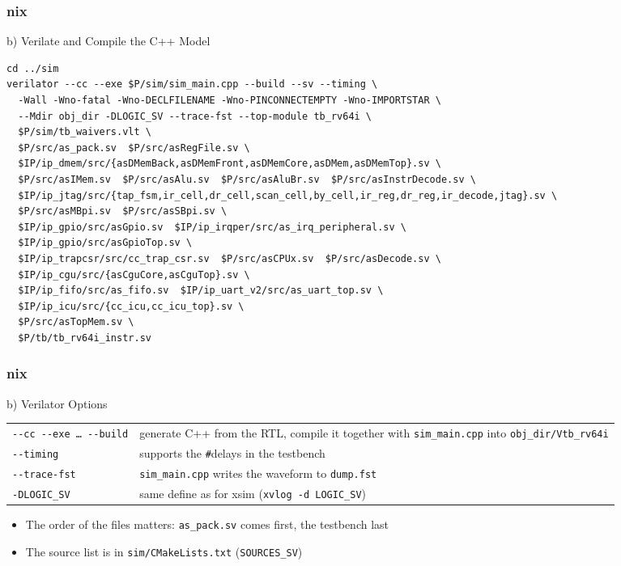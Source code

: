 \documentclass{beamer}
\newcommand{\astitle}{nix}
\newcommand{\assubtitle}{nix}
\newcommand{\cmd}[1]{\texttt{#1}}
\begin{document}
\renewcommand{\assubtitle}{b) Verilate and Compile the C++ Model}
\begin{frame}[fragile]
\frametitle{\astitle}
\begin{block}{\assubtitle}
\begin{lstlisting}[style=sh,basicstyle=\ttfamily\tiny,breaklines=false]
cd ../sim
verilator --cc --exe $P/sim/sim_main.cpp --build --sv --timing \
  -Wall -Wno-fatal -Wno-DECLFILENAME -Wno-PINCONNECTEMPTY -Wno-IMPORTSTAR \
  --Mdir obj_dir -DLOGIC_SV --trace-fst --top-module tb_rv64i \
  $P/sim/tb_waivers.vlt \
  $P/src/as_pack.sv  $P/src/asRegFile.sv \
  $IP/ip_dmem/src/{asDMemBack,asDMemFront,asDMemCore,asDMem,asDMemTop}.sv \
  $P/src/asIMem.sv  $P/src/asAlu.sv  $P/src/asAluBr.sv  $P/src/asInstrDecode.sv \
  $IP/ip_jtag/src/{tap_fsm,ir_cell,dr_cell,scan_cell,by_cell,ir_reg,dr_reg,ir_decode,jtag}.sv \
  $P/src/asMBpi.sv  $P/src/asSBpi.sv \
  $IP/ip_gpio/src/asGpio.sv  $IP/ip_irqper/src/as_irq_peripheral.sv \
  $IP/ip_gpio/src/asGpioTop.sv \
  $IP/ip_trapcsr/src/cc_trap_csr.sv  $P/src/asCPUx.sv  $P/src/asDecode.sv \
  $IP/ip_cgu/src/{asCguCore,asCguTop}.sv \
  $IP/ip_fifo/src/as_fifo.sv  $IP/ip_uart_v2/src/as_uart_top.sv \
  $IP/ip_icu/src/{cc_icu,cc_icu_top}.sv \
  $P/src/asTopMem.sv \
  $P/tb/tb_rv64i_instr.sv
\end{lstlisting}
\end{block}
\end{frame}

\renewcommand{\assubtitle}{b) Verilator Options}
\begin{frame}
\frametitle{\astitle}
\begin{block}{\assubtitle}
  \small
  \begin{tabularx}{\linewidth}{@{}lY@{}}
    \cmd{-{}-cc -{}-exe \dots{} -{}-build} & generate C++ from the RTL, compile it together with
                                         \cmd{sim\_main.cpp} into \cmd{obj\_dir/Vtb\_rv64i}\\[2pt]
    \cmd{-{}-timing}     & supports the \cmd{\#}delays in the testbench\\[2pt]
    \cmd{-{}-trace-fst}  & \cmd{sim\_main.cpp} writes the waveform to \cmd{dump.fst}\\[2pt]
    \cmd{-DLOGIC\_SV}    & same define as for xsim (\cmd{xvlog -d LOGIC\_SV})\\
  \end{tabularx}
  \vspace{4pt}
  \begin{itemize}
    \item The order of the files matters: \cmd{as\_pack.sv} comes first,
      the testbench last
    \item The source list is in \cmd{sim/CMakeLists.txt} (\cmd{SOURCES\_SV})
  \end{itemize}
\end{block}
\end{frame}
\end{document}
